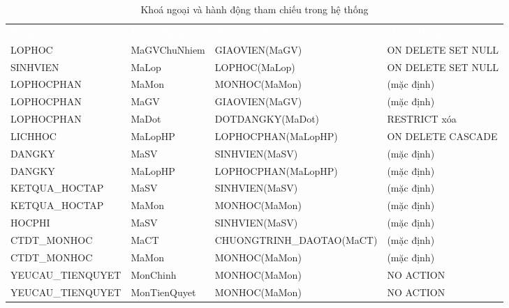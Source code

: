 \documentclass[13pt, a4paper]{article}
\begin{document}
\begin{table}[H]
\centering
\renewcommand{\arraystretch}{1.35}
\begin{tabular}{p{3cm} p{3cm} p{3.5cm} p{3.5cm}}
  \rowcolor{tableheadbg}
  \textcolor{white}{\textbf{Bảng}} &
  \textcolor{white}{\textbf{Khoá Ngoại}} &
  \textcolor{white}{\textbf{Tham Chiếu}} &
  \textcolor{white}{\textbf{Hành Động}} \\
  \rowcolor{white}      LOPHOC              & MaGVChuNhiem  & GIAOVIEN(MaGV)           & ON DELETE SET NULL \\
  \rowcolor{tablerowalt}SINHVIEN            & MaLop         & LOPHOC(MaLop)            & ON DELETE SET NULL \\
  \rowcolor{white}      LOPHOCPHAN          & MaMon         & MONHOC(MaMon)            & (mặc định) \\
  \rowcolor{tablerowalt}LOPHOCPHAN          & MaGV          & GIAOVIEN(MaGV)           & (mặc định) \\
  \rowcolor{white}      LOPHOCPHAN          & MaDot         & DOTDANGKY(MaDot)         & RESTRICT xóa \\
  \rowcolor{tablerowalt}LICHHOC             & MaLopHP       & LOPHOCPHAN(MaLopHP)      & ON DELETE CASCADE \\
  \rowcolor{white}      DANGKY              & MaSV          & SINHVIEN(MaSV)           & (mặc định) \\
  \rowcolor{tablerowalt}DANGKY              & MaLopHP       & LOPHOCPHAN(MaLopHP)      & (mặc định) \\
  \rowcolor{white}      KETQUA\_HOCTAP      & MaSV          & SINHVIEN(MaSV)           & (mặc định) \\
  \rowcolor{tablerowalt}KETQUA\_HOCTAP      & MaMon         & MONHOC(MaMon)            & (mặc định) \\
  \rowcolor{white}      HOCPHI              & MaSV          & SINHVIEN(MaSV)           & (mặc định) \\
  \rowcolor{tablerowalt}CTDT\_MONHOC        & MaCT          & CHUONGTRINH\_DAOTAO(MaCT) & (mặc định) \\
  \rowcolor{white}      CTDT\_MONHOC        & MaMon         & MONHOC(MaMon)            & (mặc định) \\
  \rowcolor{tablerowalt}YEUCAU\_TIENQUYET   & MonChinh      & MONHOC(MaMon)            & NO ACTION \\
  \rowcolor{white}      YEUCAU\_TIENQUYET   & MonTienQuyet  & MONHOC(MaMon)            & NO ACTION \\
\end{tabular}
\caption{Khoá ngoại và hành động tham chiếu trong hệ thống}
\end{table}
\end{document}
